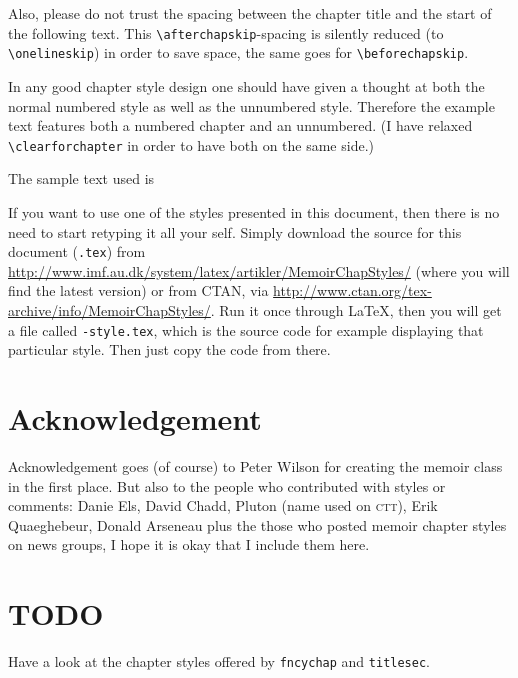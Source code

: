 Also, please do not trust the spacing between the chapter title and
the start of the following text. This \verb+\afterchapskip+-spacing is
silently reduced (to \verb+\onelineskip+) in order to save space, the
same goes for \verb+\beforechapskip+.

\starbreak

In any good chapter style design one should have given a thought at
both the normal numbered style as well as the unnumbered
style. Therefore the example text features both a numbered chapter and
an unnumbered. (I have relaxed \verb+\clearforchapter+ in order to
have both on the same side.)

The sample text used is

\starbreak

If you want to use one of the styles presented in this document, 
then there is no need to start retyping it all your self. Simply
download the source for this document (\texttt{\jobname.tex}) from
\url{http://www.imf.au.dk/system/latex/artikler/MemoirChapStyles/}
(where you will find the latest version) or from CTAN, via
\url{http://www.ctan.org/tex-archive/info/MemoirChapStyles/}. Run it
once through \LaTeX, then you will 
get a file called \texttt{-style.tex}, which is the
source code for example displaying that particular style. Then just
copy the code from there.


\section*{Acknowledgement}

Acknowledgement goes (of course) to Peter Wilson for creating the
memoir class in the first place. But also to the people who
contributed with styles or comments: Danie Els, David Chadd, Pluton
(name used on \textsc{ctt}), Erik Quaeghebeur, Donald Arseneau plus
the those who posted memoir chapter styles on news groups, I hope it
is okay that I include them here.




\section*{TODO}
\label{sec:todo}

Have a look at the chapter styles offered by \texttt{fncychap} and
\texttt{titlesec}. 


\setlength\columnsep{8mm}
\begin{multicols}{2}
  \tableofcontents*
\end{multicols}

